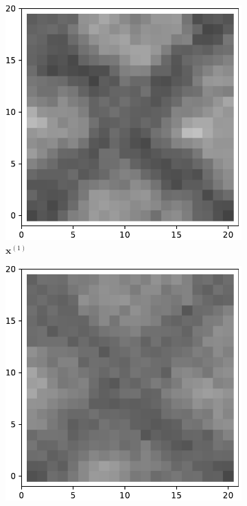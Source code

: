 \begin{figure}[!h]
\begin{subfigure}[b]{0.24\textwidth}
            \includegraphics[width=\textwidth]{./img/2d2-0.pdf}
            \caption[]%
            {{\small $\mathbf{x}^{(1)}$}}    
            \label{fig:2d21}
        \end{subfigure}
        \begin{subfigure}[b]{0.24\textwidth}   
            \centering 
            \includegraphics[width=\textwidth]{./img/2d2-99.pdf}

\end{subfigure}
\end{figure}
